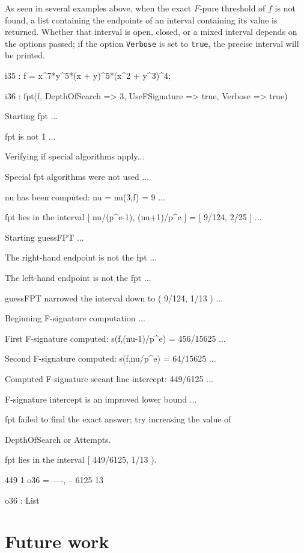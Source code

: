 \documentclass{amsart}
\begin{document}
As seen in several examples above, when the exact  $F$-pure threshold of $f$ is not found, a list containing the endpoints of an interval containing its value is returned.  Whether that interval is open, closed, or a mixed interval depends on the options passed; if the option {\tt Verbose} is set to {\tt true}, the precise interval will be printed.

{\small
{}
\begin{MyVerbatim}

i35 : f = x^7*y^5*(x + y)^5*(x^2 + y^3)^4;

i36 : fpt(f, DepthOfSearch => 3, UseFSignature => true, Verbose => true)

Starting fpt ...

fpt is not 1 ...

Verifying if special algorithms apply...

Special fpt algorithms were not used ...

nu has been computed: nu = nu(3,f) = 9 ...

fpt lies in the interval [ nu/(p^e-1), (nu+1)/p^e ] = [ 9/124, 2/25 ] ...

Starting guessFPT ...

The right-hand endpoint is not the fpt ...

The left-hand endpoint is not the fpt ...

guessFPT narrowed the interval down to ( 9/124, 1/13 ) ...

Beginning F-signature computation ...

First F-signature computed: s(f,(nu-1)/p^e) = 456/15625 ...

Second F-signature computed: s(f,nu/p^e) = 64/15625 ...

Computed F-signature secant line intercept: 449/6125 ...

F-signature intercept is an improved lower bound ...

fpt failed to find the exact answer; try increasing the value of

DepthOfSearch or Attempts.

fpt lies in the interval [ 449/6125, 1/13 ).

        449   1
o36 = {----, --}
       6125  13

o36 : List
\end{MyVerbatim}
}
\medspace

\section{Future work}
\end{document}

